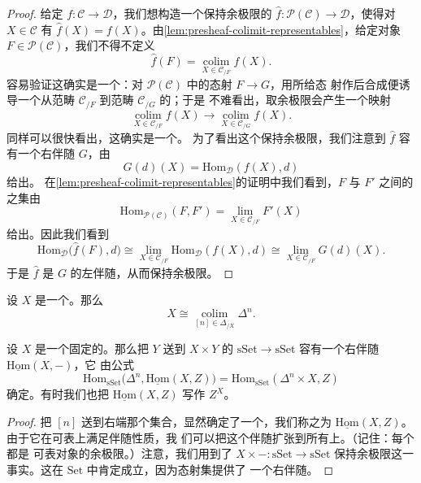 \begin{proof}
给定\trFunctor{} $f\colon \mathcal{C} \to \mathcal{D}$，我们想构造一个保持余极限的\trFunctor{}%
$\hat{f}\colon \mathcal{P}(\mathcal{C}) \to \mathcal{D}$，使得对 $X \in \mathcal{C}$
有 $\hat{f}(X) = f(X)$。由\cref{lem:presheaf-colimit-representables}，给定对象
$F \in \mathcal{P}(\mathcal{C})$，我们不得不定义
\[
\hat{f}(F) = \operatorname*{colim}_{X \in \mathcal{C}_{/F}} f(X).
\]
容易验证这确实是一个\trFunctor{}：对 $\mathcal{P}(\mathcal{C})$ 中的态射 $F \to G$，用所给态
射作后合成便诱导一个从范畴 $\mathcal{C}_{/F}$ 到范畴 $\mathcal{C}_{/G}$ 的\trFunctor{}；于是
不难看出，取余极限会产生一个映射
\[
\operatorname*{colim}_{X \in \mathcal{C}_{/F}} f(X) \to
\operatorname*{colim}_{X \in \mathcal{C}_{/G}} f(X).
\]
同样可以很快看出，这确实是一个\trFunctor{}。
为了看出这个\trFunctor{}保持余极限，我们注意到 $\hat{f}$ 容有一个右伴随 $G$，由
\[
G(d)(X) = \mathrm{Hom}_{\mathcal{D}}(f(X), d)
\]
给出。
在\cref{lem:presheaf-colimit-representables}的证明中我们看到，$F$ 与 $F'$ 之间的%
\trNaturalTransformation{}之集由
\[
\mathrm{Hom}_{\mathcal{P}(\mathcal{C})}(F, F') =
\operatorname*{lim}_{X \in \mathcal{C}_{/F}} F'(X)
\]
给出。因此我们看到
\[
\mathrm{Hom}_{\mathcal{D}}\bigl(\hat{f}(F), d\bigr) \cong
\operatorname*{lim}_{X \in \mathcal{C}_{/F}}
\mathrm{Hom}_{\mathcal{D}}(f(X), d) \cong
\operatorname*{lim}_{X \in \mathcal{C}_{/F}} G(d)(X).
\]
于是 $\hat{f}$ 是 $G$ 的左伴随，从而保持余极限。
\end{proof}

\begin{corollary}\label{cor:sset-colimit-representables}
设 $X$ 是一个\trSimplicialSet{}。那么
\[
X \cong \operatorname*{colim}_{[n] \in \Delta_{/X}} \Delta^n.
\]
\end{corollary}

\begin{lemma}\label{lem:internal-hom-adjoint}
设 $X$ 是一个固定的\trSimplicialSet{}。那么把 $Y$ 送到 $X \times Y$ 的\trFunctor{}%
$\mathrm{sSet} \to \mathrm{sSet}$ 容有一个右伴随 $\underline{\mathrm{Hom}}(X,-)$，它
由公式
\[
\mathrm{Hom}_{\mathrm{sSet}}\bigl(\Delta^n,
\underline{\mathrm{Hom}}(X,Z)\bigr) =
\mathrm{Hom}_{\mathrm{sSet}}(\Delta^n \times X, Z)
\]
确定。有时我们也把 $\underline{\mathrm{Hom}}(X,Z)$ 写作 $Z^X$。
\end{lemma}

\begin{proof}
把 $[n]$ 送到右端那个集合，显然确定了一个\trSimplicialSet{}，我们称之为
$\underline{\mathrm{Hom}}(X,Z)$。由于它在可表\trSimplicialSet{}上满足伴随性质，我
们可以把这个伴随扩张到所有\trSimplicialSet{}上。（记住：每个\trSimplicialSet{}都是
可表对象的余极限。）注意，我们用到了 $X \times -\colon \mathrm{sSet} \to \mathrm{sSet}$
保持余极限这一事实。这在 $\mathrm{Set}$ 中肯定成立，因为态射集提供了
一个右伴随。
\end{proof}

